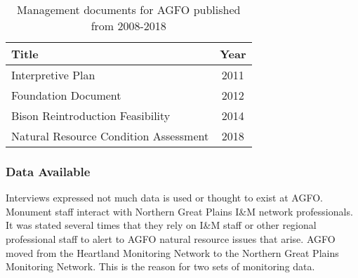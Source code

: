 \begin{table}[h]
	\centering
\caption[AGFO management documents]
	{Management documents for AGFO published from 2008-2018} 
\label{tab:AGFOManDocs}
	\begin{tabular}{lc}
		\toprule
		Title & Year\tabularnewline
		\midrule
		Interpretive Plan & 2011 \tabularnewline
		Foundation Document & 2012 \tabularnewline
		Bison Reintroduction Feasibility & 2014 \tabularnewline
		Natural Resource Condition Assessment & 2018 \tabularnewline
		\bottomrule
	\end{tabular}
\end{table}

\subsubsection{Data Available}

Interviews expressed not much data is used or thought to exist at AGFO.
Monument staff interact with Northern Great Plains I\&M network professionals. 
It was stated several times that they rely on I\&M staff or other regional professional staff to alert to AGFO natural resource issues that arise. 
AGFO moved from the Heartland Monitoring Network to the Northern Great Plains Monitoring Network. 
This is the reason for two sets of monitoring data.

